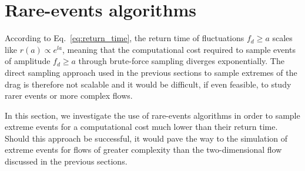 \documentclass{jfm}
\begin{document}



\section{Rare-events algorithms}
\label{sec:rare_events_algorithms}

According to Eq.~\eqref{eq:return_time}, the return time of fluctuations $f_d \geq a$ scales like
$r(a)\propto e^{l a}$, meaning that the computational cost required to sample events of amplitude $f_d \geq a$ through brute-force sampling diverges exponentially.
The direct sampling approach used in the previous sections to sample extremes of the drag is therefore not scalable and it would be difficult, if even feasible, to study rarer events or more complex flows.

In this section, we investigate the use of rare-events algorithms in order to sample extreme events for a
computational cost much lower than their return time.
Should this approach be successful, it would pave the way to the simulation of extreme events for flows of
greater complexity than the two-dimensional flow discussed in the previous sections.
\end{document}
